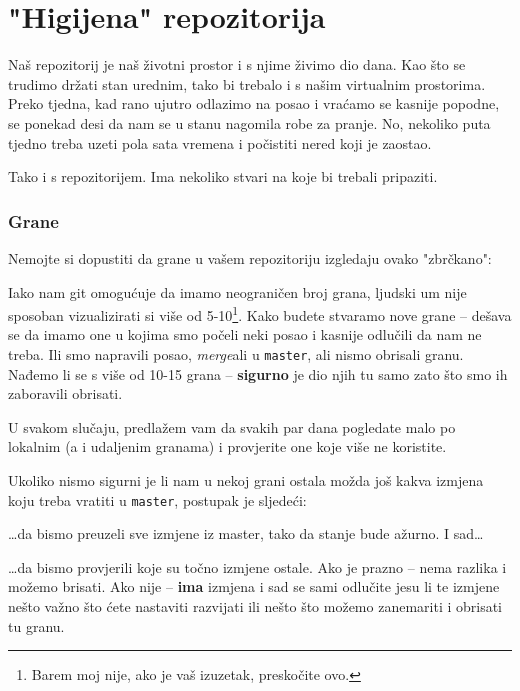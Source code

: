 \chapter*{"Higijena" repozitorija}

Naš repozitorij je naš životni prostor i s njime živimo dio dana.
Kao što se trudimo držati stan urednim, tako bi trebalo i s našim virtualnim prostorima.
Preko tjedna, kad rano ujutro odlazimo na posao i vraćamo se kasnije popodne, se ponekad desi da nam se u stanu nagomila robe za pranje.
No, nekoliko puta tjedno treba uzeti pola sata vremena i počistiti nered koji je zaostao.

Tako i s repozitorijem.
Ima nekoliko stvari na koje bi trebali pripaziti.

\subsection*{Grane}

Nemojte si dopustiti da grane u vašem repozitoriju izgledaju ovako "zbrčkano":



Iako nam git omogućuje da imamo neograničen broj grana, ljudski um nije sposoban vizualizirati si više od 5-10\footnote{Barem moj nije, ako je vaš izuzetak, preskočite ovo.}.
Kako budete stvaramo nove grane -- dešava se da imamo one u kojima smo počeli neki posao i kasnije odlučili da nam ne treba.
Ili smo napravili posao, \emph{merge}ali u \verb+master+, ali nismo obrisali granu.
Nađemo li se s više od 10-15 grana -- \textbf{sigurno} je dio njih tu samo zato što smo ih zaboravili obrisati.

U svakom slučaju, predlažem vam da svakih par dana pogledate malo po lokalnim (a i udaljenim granama) i provjerite one koje više ne koristite.

Ukoliko nismo sigurni je li nam u nekoj grani ostala možda još kakva izmjena koju treba vratiti u \verb+master+, postupak je sljedeći:


\dots{}da bismo preuzeli sve izmjene iz master, tako da stanje bude ažurno.
I sad\dots


\dots{}da bismo provjerili koje su točno izmjene ostale.
Ako je prazno -- nema razlika i možemo brisati.
Ako nije -- \textbf{ima} izmjena i sad se sami odlučite jesu li te izmjene nešto važno što ćete nastaviti razvijati ili nešto što možemo zanemariti i obrisati tu granu.

